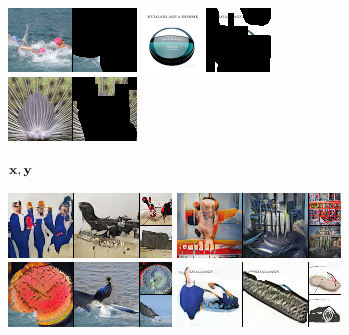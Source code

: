 \begin{figure}[t]
\begin{subfigure}[t]{0.15\textwidth}
      \includegraphics[height=\imagenetimgheight]{figs/cigcvae/image-samples/imagenet64/freeform_aipo_2_gt_masked.png}
      \includegraphics[height=\imagenetimgheight]{figs/cigcvae/image-samples/imagenet64/freeform_aipo_3_gt_masked.png}
      \includegraphics[height=\imagenetimgheight]{figs/cigcvae/image-samples/imagenet64/freeform_aipo_4_gt_masked.png}
      \caption*{\scriptsize ${\mathbf{x}}, {\mathbf{y}}$}
    \end{subfigure}
    \begin{subfigure}[t]{0.2\textwidth}
      \centering
      \includegraphics[height=\imagenetimgheight]{figs/cigcvae/image-samples/imagenet64/freeform_co_mod_gan_0_samples.png}
      \includegraphics[height=\imagenetimgheight]{figs/cigcvae/image-samples/imagenet64/freeform_co_mod_gan_1_samples.png}
      \includegraphics[height=\imagenetimgheight]{figs/cigcvae/image-samples/imagenet64/freeform_co_mod_gan_2_samples.png}
      \includegraphics[height=\imagenetimgheight]{figs/cigcvae/image-samples/imagenet64/freeform_co_mod_gan_3_samples.png}

\end{subfigure}
\end{figure}
